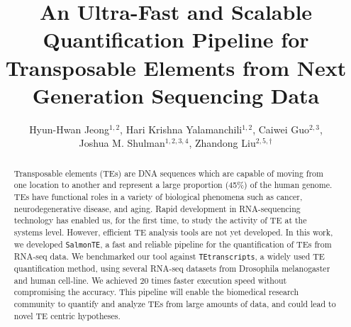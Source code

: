 \documentclass[wsdraft]{ws-procs11x85}
\newcommand{\TEtranscripts}{\texttt{TEtranscripts}}
\newcommand{\SalmonTE}{\texttt{SalmonTE}}
\begin{document}
\title{An Ultra-Fast and Scalable Quantification Pipeline for Transposable Elements from Next Generation Sequencing Data}

\author{Hyun-Hwan Jeong$^{1,2}$, Hari Krishna Yalamanchili$^{1,2}$, Caiwei Guo$^{2,3}$, \\
Joshua M. Shulman$^{1,2,3,4}$, Zhandong Liu$^{2,5,\dag}$}

\address{$^{1}$Department of Molecular and Human Genetics, Baylor College of Medicine,\\
$^{2}$Jan and Dan Duncan Neurological Research Institute, Texas Children’s Hospital,\\
$^{3}$Department of Neuroscience, Baylor College of Medicine,\\
$^{4}$Department of Neurology, Baylor College of Medicine,\\
$^{5}$Department of Pediatrics, Baylor College of Medicine,\\
Houston, Texas 77030, USA\\
$^{\dag}$E-mail: zhandonl@bcm.edu}

\begin{abstract}

Transposable elements (TEs) are DNA sequences 
which are capable of moving from one location to another
and represent a large proportion (45\%) of the human genome. 
TEs have functional roles
in a variety of biological phenomena such as
cancer,
neurodegenerative disease, and aging.
Rapid development in RNA-sequencing technology has enabled us, for the first time, to study the activity of TE at the systems level.  
% 
% 
% 
%
% 
%
However, efficient TE analysis tools are not yet developed.
In this work, we developed \SalmonTE, a fast and reliable pipeline for the quantification of TEs from 
RNA-seq data.
We benchmarked our tool against \TEtranscripts, a widely used TE quantification method, using several RNA-seq datasets from
Drosophila melanogaster
and human cell-line.
We achieved 20 times faster execution speed without compromising the accuracy.
This pipeline will enable the biomedical research community to quantify and analyze TEs from large amounts of data, and could lead to novel TE centric hypotheses.


\end{abstract}
\end{document}
